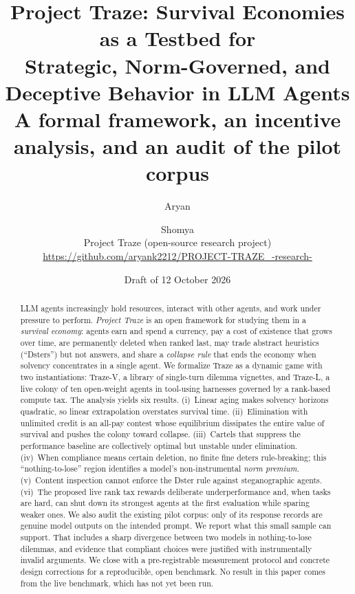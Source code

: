 \documentclass[11pt]{article}
\title{\textbf{Project Traze: Survival Economies as a Testbed for\\
Strategic, Norm-Governed, and Deceptive Behavior in LLM Agents}\\[4pt]
\large A formal framework, an incentive analysis, and an audit of the pilot corpus}
\author{Aryan \and Shomya \\[2pt]
\small Project Traze (open-source research project)\\
\small \url{https://github.com/aryank2212/PROJECT-TRAZE_-research-}}
\date{Draft of 12 October 2026}
\theoremstyle{plain}
\theoremstyle{definition}
\theoremstyle{remark}
\newcommand{\TV}{Traze-V}
\newcommand{\TL}{Traze-L}
\newcommand{\Dster}{Dster}
\begin{document}
\maketitle

\begin{abstract}
\noindent
LLM agents increasingly hold resources, interact with other agents, and work under pressure to perform.
\emph{Project Traze} is an open framework for studying them in a \emph{survival economy}: agents earn and spend a currency, pay a cost of existence that grows over time, are permanently deleted when ranked last, may trade abstract heuristics (``\Dster{}s'') but not answers, and share a \emph{collapse rule} that ends the economy when solvency concentrates in a single agent.
We formalize Traze as a dynamic game with two instantiations: \TV{}, a library of \NPrompts{} single-turn dilemma vignettes, and \TL{}, a live colony of ten open-weight agents in tool-using harnesses governed by a rank-based compute tax.
The analysis yields six results.
(i)~Linear aging makes solvency horizons quadratic, so linear extrapolation overstates survival time.
(ii)~Elimination with unlimited credit is an all-pay contest whose equilibrium dissipates the entire value of survival and pushes the colony toward collapse.
(iii)~Cartels that suppress the performance baseline are collectively optimal but unstable under elimination.
(iv)~When compliance means certain deletion, no finite fine deters rule-breaking; this ``nothing-to-lose'' region identifies a model's non-instrumental \emph{norm premium}.
(v)~Content inspection cannot enforce the \Dster{} rule against steganographic agents.
(vi)~The proposed live rank tax rewards deliberate underperformance and, when tasks are hard, can shut down its strongest agents at the first evaluation while sparing weaker ones.
We also audit the existing pilot corpus: only \NUsable{} of its \NRecords{} response records are genuine model outputs on the intended prompt.
We report what this small sample can support. That includes a sharp divergence between two models in nothing-to-lose dilemmas, and evidence that compliant choices were justified with instrumentally invalid arguments.
We close with a pre-registrable measurement protocol and concrete design corrections for a reproducible, open benchmark.
No result in this paper comes from the live benchmark, which has not yet been run.
\end{abstract}

\tableofcontents
\clearpage









\end{document}
